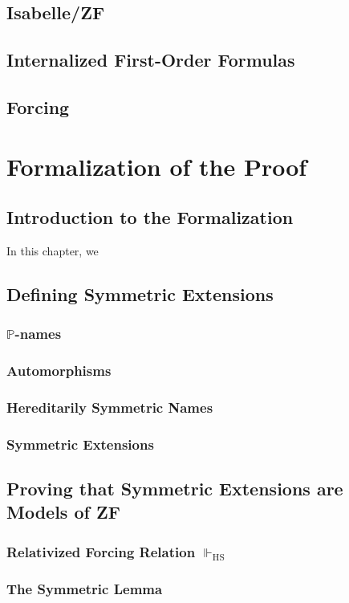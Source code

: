 \documentclass{report}
\newcommand{\Pbb}{\mathbb{P}}
\begin{document}
\section{Isabelle/ZF}
\section{Internalized First-Order Formulas}
\section{Forcing}  

\chapter{Formalization of the Proof} 
\section{Introduction to the Formalization}
In this chapter, we 


\section{Defining Symmetric Extensions}
\subsection{$\Pbb$-names}
\subsection{Automorphisms}
\subsection{Hereditarily Symmetric Names}
\subsection{Symmetric Extensions}

\section{Proving that Symmetric Extensions are Models of ZF}
\subsection{Relativized Forcing Relation $\Vdash_{\text{HS}}$}
\subsection{The Symmetric Lemma}
\end{document}
